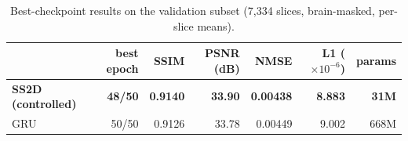 \begin{table}[ht]
\centering
\caption{Best-checkpoint results on the validation subset (7{,}334 slices, brain-masked, per-slice means).}
\label{tab:best}
\begin{tabular}{lrrrrrr}
\toprule
 & best epoch & SSIM & PSNR (dB) & NMSE & L1 ($\times 10^{-6}$) & params \\
\midrule
\textbf{SS2D (controlled)} & \textbf{48/50} & \textbf{0.9140} & \textbf{33.90} & \textbf{0.00438} & \textbf{8.883} & \textbf{31M} \\
GRU & 50/50 & 0.9126 & 33.78 & 0.00449 & 9.002 & 668M \\
\bottomrule
\end{tabular}
\end{table}
